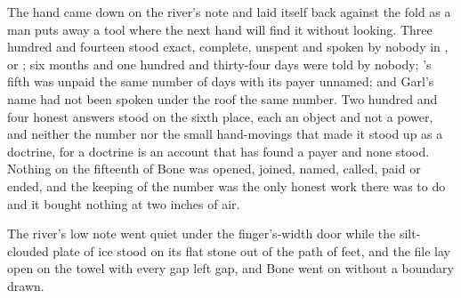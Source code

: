 The hand came down on the river's note and laid itself back against the fold as a man puts away a tool where the next hand will find it without looking. Three hundred and fourteen stood exact, complete, unspent and spoken by nobody in ,  or ; six months and one hundred and thirty-four days were told by nobody; 's fifth was unpaid the same number of days with its payer unnamed; and Garl's name had not been spoken under the roof the same number. Two hundred and four honest answers stood on the sixth place, each an object and not a power, and neither the number nor the small hand-movings that made it stood up as a doctrine, for a doctrine is an account that has found a payer and none stood. Nothing on the fifteenth of Bone was opened, joined, named, called, paid or ended, and the keeping of the number was the only honest work there was to do and it bought nothing at two inches of air.

The river's low note went quiet under the finger's-width door while the silt-clouded plate of ice stood on its flat stone out of the path of feet, and the file lay open on the towel with every gap left gap, and Bone went on without a boundary drawn.
